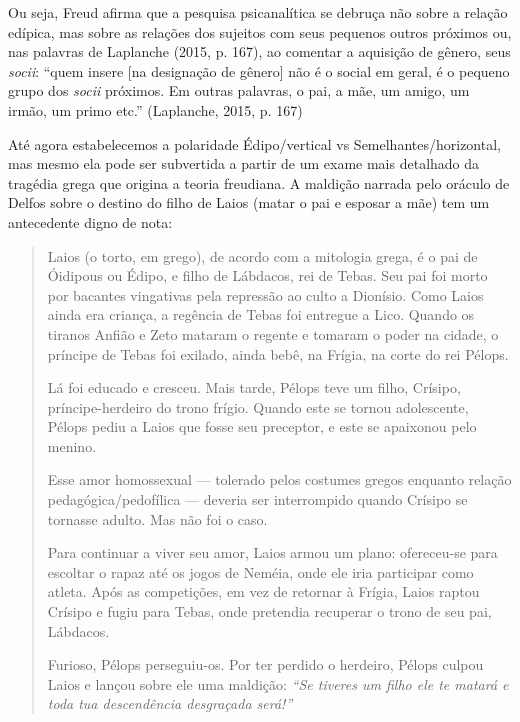 Ou seja, Freud afirma que a pesquisa psicanalítica se debruça não sobre
a relação edípica, mas sobre as relações dos sujeitos com seus pequenos
outros próximos ou, nas palavras de Laplanche (2015, p. 167), ao
comentar a aquisição de gênero, seus \emph{socii}: ``quem insere {[}na
designação de gênero{]} não é o social em geral, é o pequeno grupo dos
\emph{socii} próximos. Em outras palavras, o pai, a mãe, um amigo, um
irmão, um primo etc.'' (Laplanche, 2015, p. 167)

Até agora estabelecemos a polaridade Édipo/vertical vs
Semelhantes/horizontal, mas mesmo ela pode ser subvertida a partir de um
exame mais detalhado da tragédia grega que origina a teoria freudiana. A
maldição narrada pelo oráculo de Delfos sobre o destino do filho de
Laios (matar o pai e esposar a mãe) tem um antecedente digno de nota:

\begin{quote}
Laios (o torto, em grego), de acordo com a mitologia grega, é o pai de
Óidipous ou Édipo, e filho de Lábdacos, rei de Tebas. Seu pai foi morto
por bacantes vingativas pela repressão ao culto a Dionísio. Como Laios
ainda era criança, a regência de Tebas foi entregue a Lico. Quando os
tiranos Anfião e Zeto mataram o regente e tomaram o poder na cidade, o
príncipe de Tebas foi exilado, ainda bebê, na Frígia, na corte do rei
Pélops.

Lá foi educado e cresceu. Mais tarde, Pélops teve um filho, Crísipo,
príncipe-herdeiro do trono frígio. Quando este se tornou adolescente,
Pélops pediu a Laios que fosse seu preceptor, e este se apaixonou pelo
menino.

Esse amor homossexual --- tolerado pelos costumes gregos enquanto
relação pedagógica/pedofílica --- deveria ser interrompido quando
Crísipo se tornasse adulto. Mas não foi o caso.

Para continuar a viver seu amor, Laios armou um plano: ofereceu-se para
escoltar o rapaz até os jogos de Neméia, onde ele iria participar como
atleta. Após as competições, em vez de retornar à Frígia, Laios raptou
Crísipo e fugiu para Tebas, onde pretendia recuperar o trono de seu pai,
Lábdacos.

Furioso, Pélops perseguiu-os. Por ter perdido o herdeiro, Pélops culpou
Laios e lançou sobre ele uma maldição: \emph{``Se tiveres um filho ele
te matará e toda tua descendência desgraçada será!''}
\end{quote}


